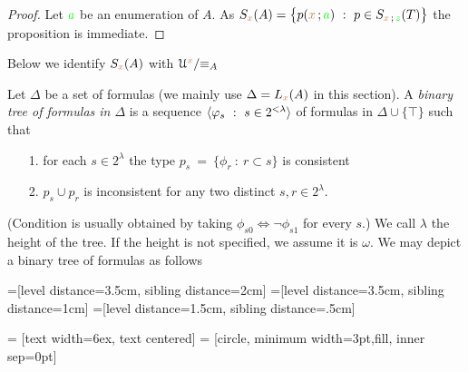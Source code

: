 \begin{proof}
Let ${\color{green} a}$ be an enumeration of $A$.
As $S_{\mr x}(A)=\big\{p({\mr x}\,;{\gr a})\ :\ p\in S_{{\mr x}\,;\,{\gr z}}(T)\big\}$ the proposition is immediate.
\end{proof}

Below we identify $S_{\color{brown} x}(A)$ with $\EuScript U^{\color{brown} x}/\mathord\equiv_A$

\begin{definition}\label{def_tree_formulas}
Let $\Delta$ be a set of formulas (we mainly use $\Delta=L_{\color{brown} x}(A)$ in this section).
A \emph{binary tree of formulas in $\Delta$\/} is a sequence $\<\phi_s\ :\ s\in2^{<\lambda}\>$ of formulas in $\Delta\cup\{\top\}$ such that\nobreak
\begin{itemize}
\item[1.] for each $s\in 2^\lambda$ the type $p_s\ =\ \big\{\phi_r\ :\ r\subset s\big\}$ is consistent
\item[2.] $p_s\cup p_r$ is inconsistent for any two distinct $s,r\in 2^\lambda$.
\end{itemize}
(Condition  is usually obtained by taking $\phi_{s0}\iff\neg\phi_{s1}$ for every $s$.) We call $\lambda$ the height of the tree.
If the height is not specified, we assume it is $\omega$.
We may depict a binary tree of formulas as follows
\baselineskip

=[level distance=3.5cm, sibling distance=2cm]
=[level distance=3.5cm, sibling distance=1cm]
=[level distance=1.5cm, sibling distance=.5cm]

 = [text width=6ex, text centered]
 = [circle, minimum width=3pt,fill, inner sep=0pt]

\def\leaf{...}


\end{definition}
